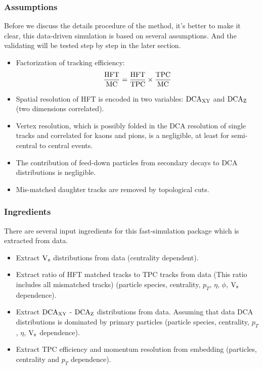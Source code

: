 \documentclass[a4paper]{article}
\begin{document}
\subsubsection{Assumptions}
\label{assumptions}
Before we discuss the details procedure of the method, it's better to make it clear, this data-driven simulation is based on several assumptions. And the validating will be tested step by step in the later section.
\begin{itemize}
\item Factorization of tracking efficiency:
\begin{equation}
\frac{\textup{HFT}}{\textup{MC}} = \frac{\textup{HFT}}{\textup{TPC}} \times \frac{\textup{TPC}}{\textup{MC}}
\label{efffact}
\end{equation}
\item Spatial resolution of HFT is encoded in two variables: $\textup{DCA}_{\textup{XY}}$ and $\textup{DCA}_{\textup{Z}}$ (two dimensions correlated).
\item Vertex resolution, which is possibly folded in the DCA resolution of single tracks and correlated for kaons and pions, is a negligible, at least for semi-central to central events.
\item The contribution of feed-down particles from secondary decays to DCA distributions is negligible.
\item Mis-matched daughter tracks are removed by topological cuts.
\end{itemize}

\subsubsection{Ingredients}
\label{ingredients}
There are several input ingredients for this fast-simulation package which is extracted from data.
\begin{itemize}
\item Extract $\textup{V}_\textup{z}$ distributions from data (centrality dependent).
\item Extract ratio of HFT matched tracks to TPC tracks from data (This ratio includes all mismatched tracks) (particle species, centrality, $p_T$, $\eta$, $\phi$, $\textup{V}_\textup{z}$ dependence).
\item Extract $\textup{DCA}_{\textup{XY}}$ - $\textup{DCA}_{\textup{Z}}$ distributions from data. Assuming that data DCA distributions is dominated by primary particles (particle species, centrality, $p_T$, $\eta$, $\textup{V}_\textup{z}$ dependence).
\item Extract TPC efficiency and momentum resolution from embedding (particles, centrality and $p_T$ dependence).
\end{itemize}
\end{document}
